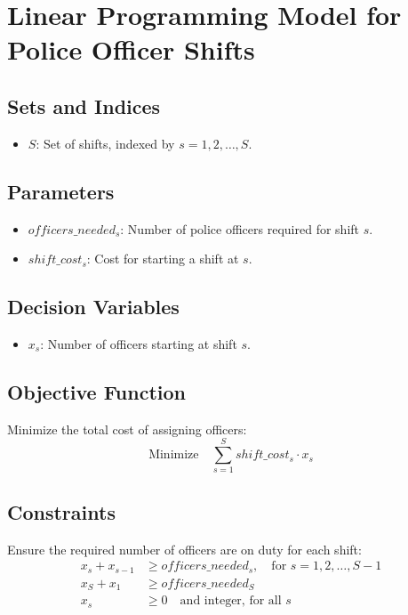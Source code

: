 \documentclass{article}
\begin{document}
\section*{Linear Programming Model for Police Officer Shifts}

\subsection*{Sets and Indices}
\begin{itemize}
    \item $S$: Set of shifts, indexed by $s = 1, 2, \ldots, S$.
\end{itemize}

\subsection*{Parameters}
\begin{itemize}
    \item $officers\_needed_s$: Number of police officers required for shift $s$.
    \item $shift\_cost_s$: Cost for starting a shift at $s$.
\end{itemize}

\subsection*{Decision Variables}
\begin{itemize}
    \item $x_s$: Number of officers starting at shift $s$.
\end{itemize}

\subsection*{Objective Function}
Minimize the total cost of assigning officers:
\[
\text{Minimize} \quad \sum_{s=1}^{S} shift\_cost_s \cdot x_s
\]

\subsection*{Constraints}
Ensure the required number of officers are on duty for each shift:
\begin{align*}
    x_s + x_{s-1} &\geq officers\_needed_s, \quad \text{for } s = 1,2,\ldots,S-1 \\
    x_S + x_{1} &\geq officers\_needed_S \\
    x_s &\geq 0 \quad \text{and integer, for all } s
\end{align*}
\end{document}
